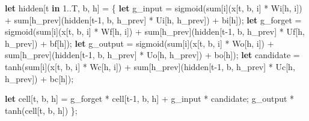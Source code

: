 \documentclass[11pt,]{article}
\newenvironment{Shaded}{}{}
\newcommand{\DecValTok}[1]{\textcolor[rgb]{0.25,0.63,0.44}{#1}}
\newcommand{\KeywordTok}[1]{\textcolor[rgb]{0.00,0.44,0.13}{\textbf{#1}}}
\newcommand{\NormalTok}[1]{#1}
\newcommand{\OperatorTok}[1]{\textcolor[rgb]{0.40,0.40,0.40}{#1}}
\begin{document}
\begin{Shaded}
\begin{Highlighting}[]
\KeywordTok{let}\NormalTok{ hidden}\OperatorTok{[}\NormalTok{t }\KeywordTok{in} \DecValTok{1.}\NormalTok{.T, b, h}\OperatorTok{]}\NormalTok{ = }\OperatorTok{\{}
    \KeywordTok{let}\NormalTok{ g_input = sigmoid(sum}\OperatorTok{[}\NormalTok{i}\OperatorTok{]}\NormalTok{(x}\OperatorTok{[}\NormalTok{t, b, i}\OperatorTok{]}\NormalTok{ * Wi}\OperatorTok{[}\NormalTok{h, i}\OperatorTok{]}\NormalTok{)}
\NormalTok{                        + sum}\OperatorTok{[}\NormalTok{h_prev}\OperatorTok{]}\NormalTok{(hidden}\OperatorTok{[}\NormalTok{t-}\DecValTok{1}\NormalTok{, b, h_prev}\OperatorTok{]}\NormalTok{ * Ui}\OperatorTok{[}\NormalTok{h, h_prev}\OperatorTok{]}\NormalTok{)}
\NormalTok{                        + bi}\OperatorTok{[}\NormalTok{h}\OperatorTok{]}\NormalTok{);}
    \KeywordTok{let}\NormalTok{ g_forget = sigmoid(sum}\OperatorTok{[}\NormalTok{i}\OperatorTok{]}\NormalTok{(x}\OperatorTok{[}\NormalTok{t, b, i}\OperatorTok{]}\NormalTok{ * Wf}\OperatorTok{[}\NormalTok{h, i}\OperatorTok{]}\NormalTok{)}
\NormalTok{                         + sum}\OperatorTok{[}\NormalTok{h_prev}\OperatorTok{]}\NormalTok{(hidden}\OperatorTok{[}\NormalTok{t-}\DecValTok{1}\NormalTok{, b, h_prev}\OperatorTok{]}\NormalTok{ * Uf}\OperatorTok{[}\NormalTok{h, h_prev}\OperatorTok{]}\NormalTok{)}
\NormalTok{                         + bf}\OperatorTok{[}\NormalTok{h}\OperatorTok{]}\NormalTok{);}
    \KeywordTok{let}\NormalTok{ g_output = sigmoid(sum}\OperatorTok{[}\NormalTok{i}\OperatorTok{]}\NormalTok{(x}\OperatorTok{[}\NormalTok{t, b, i}\OperatorTok{]}\NormalTok{ * Wo}\OperatorTok{[}\NormalTok{h, i}\OperatorTok{]}\NormalTok{)}
\NormalTok{                         + sum}\OperatorTok{[}\NormalTok{h_prev}\OperatorTok{]}\NormalTok{(hidden}\OperatorTok{[}\NormalTok{t-}\DecValTok{1}\NormalTok{, b, h_prev}\OperatorTok{]}\NormalTok{ * Uo}\OperatorTok{[}\NormalTok{h, h_prev}\OperatorTok{]}\NormalTok{)}
\NormalTok{                         + bo}\OperatorTok{[}\NormalTok{h}\OperatorTok{]}\NormalTok{);}
    \KeywordTok{let}\NormalTok{ candidate = tanh(sum}\OperatorTok{[}\NormalTok{i}\OperatorTok{]}\NormalTok{(x}\OperatorTok{[}\NormalTok{t, b, i}\OperatorTok{]}\NormalTok{ * Wc}\OperatorTok{[}\NormalTok{h, i}\OperatorTok{]}\NormalTok{)}
\NormalTok{                       + sum}\OperatorTok{[}\NormalTok{h_prev}\OperatorTok{]}\NormalTok{(hidden}\OperatorTok{[}\NormalTok{t-}\DecValTok{1}\NormalTok{, b, h_prev}\OperatorTok{]}\NormalTok{ * Uc}\OperatorTok{[}\NormalTok{h, h_prev}\OperatorTok{]}\NormalTok{)}
\NormalTok{                       + bc}\OperatorTok{[}\NormalTok{h}\OperatorTok{]}\NormalTok{);}

    \KeywordTok{let}\NormalTok{ cell}\OperatorTok{[}\NormalTok{t, b, h}\OperatorTok{]}\NormalTok{ = g_forget * cell}\OperatorTok{[}\NormalTok{t-}\DecValTok{1}\NormalTok{, b, h}\OperatorTok{]}\NormalTok{ + g_input * candidate;}
\NormalTok{    g_output * tanh(cell}\OperatorTok{[}\NormalTok{t, b, h}\OperatorTok{]}\NormalTok{)}
\OperatorTok{\}}\NormalTok{;}
\end{Highlighting}
\end{Shaded}
\end{document}
